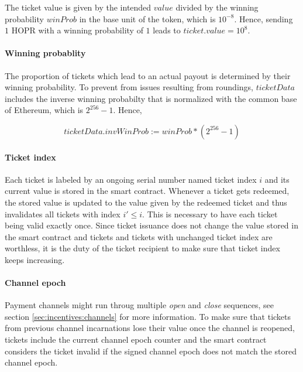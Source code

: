 The ticket value is given by the intended $value$ divided by the winning probability $winProb$ in the base unit of the token, which is $10^{-8}$. Hence, sending $1$ HOPR with a winning probability of $1$ leads to $ticket.value = 10^8$.

\paragraph{Winning probablity}
\label{sec:tickets:issuance:winningprobability}

The proportion of tickets which lead to an actual payout is determined by their winning probability. To prevent from issues resulting from roundings, $ticketData$ includes the inverse winning probabilty that is normalized with the common base of Ethereum, which is $2^{256} - 1$. Hence,

$$ ticketData.invWinProb := winProb * (2^{256} -1)$$

\paragraph{Ticket index}
\label{sec:tickets:issuance:ticketindex}

Each ticket is labeled by an ongoing serial number named ticket index $i$ and its current value is stored in the smart contract. Whenever a ticket gets redeemed, the stored value is updated to the value given by the redeemed ticket and thus invalidates all tickets with index $i' \le i$. This is necessary to have each ticket being valid exactly once. Since ticket issuance does not change the value stored in the smart contract and tickets and tickets with unchanged ticket index are worthless, it is the duty of the ticket recipient to make sure that ticket index keeps increasing.

\paragraph{Channel epoch}
\label{sec:tickets:issuance:channelepoch}

Payment channels might run throug multiple \textit{open} and \textit{close} sequences, see section \ref{sec:incentives:channels} for more information. To make sure that tickets from previous channel incarnations lose their value once the channel is reopened, tickets include the current channel epoch counter and the smart contract considers the ticket invalid if the signed channel epoch does not match the stored channel epoch.

